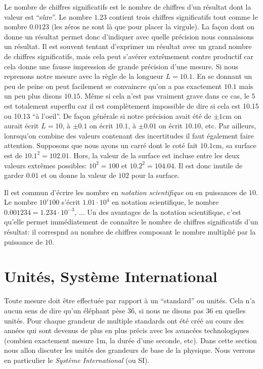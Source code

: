 \documentclass[a4paper,12pt]{book}
\newcommand{\cm}{\mathrm{cm}}
\begin{document}
Le nombre de chiffres significatifs est le nombre de chiffres d'un résultat dont la valeur est ``sûre''. Le nombre $1.23$ contient trois chiffres 
significatifs tout comme le nombre $0.0123$ (les zéros ne sont là que pour placer la virgule). La façon dont on donne un résultat
permet donc d'indiquer avec quelle précision nous connaissons un résultat. Il est souvent tentant d'exprimer un résultat avec un grand nombre de chiffres
significatifs, mais cela peut s'avérer extrêmement contre productif car cela donne une fausse impression de grande précision d'une mesure.
Si nous reprenons notre mesure avec la règle de la longueur $L=10.1$. En se donnant un peu de peine on peut facilement se convaincre qu'on a
pas exactement $10.1$ mais un peu plus disons $10.15$. Même si cela n'est pas vraiment grave dans ce cas, le $5$ est totalement superflu
car il est complètement impossible de dire si cela est 10.15 ou 10.13 ``à l'oeil''. De façon générale si notre précision avait été de $\pm 1\cm$
on aurait écrit $L=10$, à $\pm 0.1$ on écrit $10.1$, à $\pm 0.01$ on écrit $10.10$, etc. Par ailleurs, lonrsqu'on combine des valeurs contenant
des incertitudes il faut également faire attention. Supposons que nous ayons un carré dont le coté fait $10.1\cm$, sa surface est de 
$10.1^2=102.01$. Hors, la valeur de la surface est incluse entre les deux valeurs extrêmes possibles: $10^2=100$ et $10.2^2=104.04$. Il est 
donc inutile de garder $0.01$ et on donne la valeur de $102$ pour la surface.

Il est commun d'écrire les nombre en \textit{notation scientifique} ou en puissances de $10$. Le nombre $10'100$ s'écrit $1.01\cdot 10^4$ en notation
scientifique, le nombre $0.001234=1.234\cdot 10^{-3}$, ... Un des avantages de la notation scientifique, c'est qu'elle permet immédiatement de connaître le nombre de chiffres
significatifs d'un résultat: il correspnd au nombre de chiffres composant le nombre multiplié par la puissance de $10$.

\section{Unités, Système International}

Toute mesure doit être effectuée par rapport à un ``standard'' ou unités. Cela n'a aucun sens de dire qu'un éléphant pèse 36, si nous ne disons pas
36 en quelles unités. Pour chaque grandeur de multiple standards ont été créé au cours des années qui sont devenus de plus en plus précis
avec les avancées technologiques (combien exactement mesure 1m, la durée d'une seconde, etc). 
Dans cette section nous allon discuter les unités des grandeurs de base  de la physique. Nous verrons en particulier le \textit{Système International} (ou SI).
\end{document}
